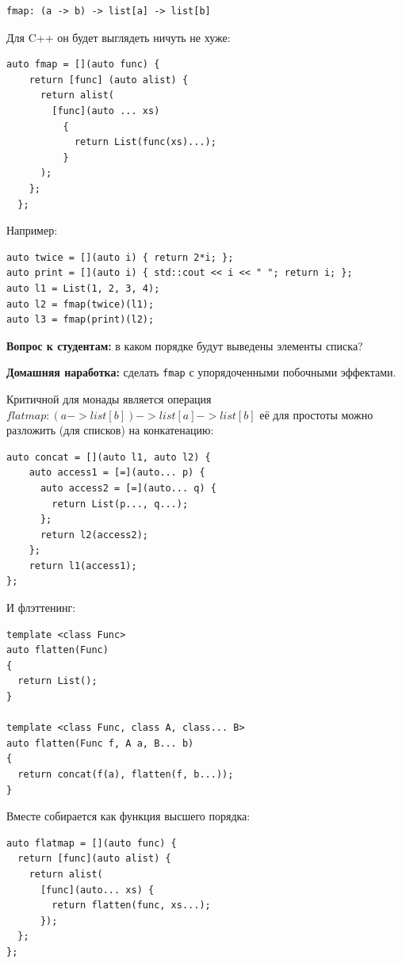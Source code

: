 \documentclass[a4paper,12pt,oneside]{article}
\newif\ifanswers
\begin{document}
\begin{verbatim}
fmap: (a -> b) -> list[a] -> list[b]
\end{verbatim}

Для C++ он будет выглядеть ничуть не хуже:

\begin{lstlisting}
auto fmap = [](auto func) {
    return [func] (auto alist) {
      return alist(
        [func](auto ... xs)
          {
            return List(func(xs)...);  
          }
      );
    };
  };
\end{lstlisting}

Например:

\begin{lstlisting}
auto twice = [](auto i) { return 2*i; };
auto print = [](auto i) { std::cout << i << " "; return i; };
auto l1 = List(1, 2, 3, 4);
auto l2 = fmap(twice)(l1);
auto l3 = fmap(print)(l2);
\end{lstlisting}

\textbf{Вопрос к студентам:} в каком порядке будут выведены элементы списка?

\ifanswers
Правильный ответ: практически в любом. Внутри \lstinline!fmap! будет сгенерирован вызов конструктора списка, который берет на вход вызовы функций вывода.
\fi

\textbf{Домашняя наработка:} сделать \lstinline!fmap! с упорядоченными побочными эффектами.

Критичной для монады является операция $flatmap: (a -> list[b]) -> list[a] -> list[b]$ её для простоты можно разложить (для списков) на конкатенацию:

\begin{lstlisting}
auto concat = [](auto l1, auto l2) {
    auto access1 = [=](auto... p) {
      auto access2 = [=](auto... q) {
        return List(p..., q...);
      };
      return l2(access2);
    };
    return l1(access1);
};
\end{lstlisting}

И флэттенинг:
 
\begin{lstlisting}
template <class Func>
auto flatten(Func)
{
  return List(); 
}
 
template <class Func, class A, class... B>
auto flatten(Func f, A a, B... b)
{
  return concat(f(a), flatten(f, b...));
}
\end{lstlisting}
 
Вместе собирается как функция высшего порядка:

\begin{lstlisting}
auto flatmap = [](auto func) {
  return [func](auto alist) {
    return alist(
      [func](auto... xs) { 
        return flatten(func, xs...);  
      });
  };
};
\end{lstlisting}
\end{document}
